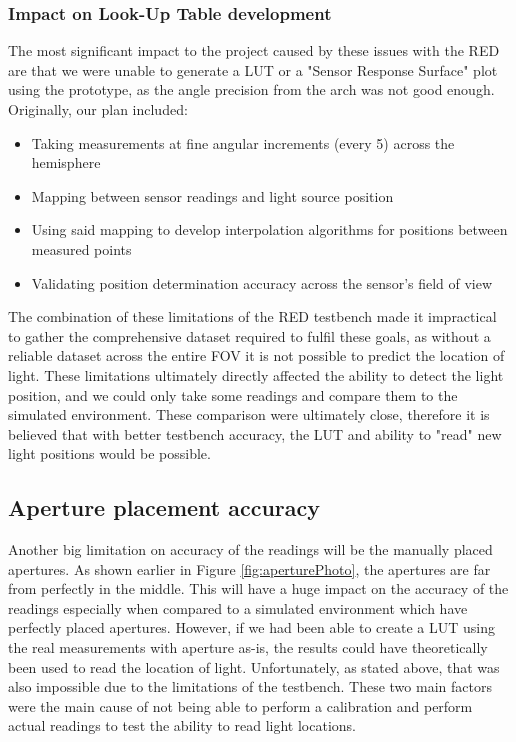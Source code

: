 \subsubsection{Impact on Look-Up Table development}

The most significant impact to the project caused by these issues with the \ac{RED} are that we were unable to generate a \ac{LUT} or a "Sensor Response Surface" plot using the prototype, as the angle precision from the arch was not good enough. Originally, our plan included:

\begin{itemize}
    \item Taking measurements at fine angular increments (every 5\textdegree{}) across the hemisphere
    \item Mapping between sensor readings and light source position
    \item Using said mapping to develop interpolation algorithms for positions between measured points
    \item Validating position determination accuracy across the sensor's field of view
\end{itemize}

The combination of these limitations of the \ac{RED} testbench made it impractical to gather the comprehensive dataset required to fulfil these goals, as without a reliable dataset across the entire \ac{FOV} it is not possible to predict the location of light.
These limitations ultimately directly affected the ability to detect the light position, and we could only take some readings and compare them to the simulated environment. These comparison were ultimately close, therefore it is believed that with better testbench accuracy, the \ac{LUT} and ability to "read" new light positions would be possible.

\subsection{Aperture placement accuracy}

Another big limitation on accuracy of the readings will be the manually placed apertures. As shown earlier in Figure \ref{fig:aperturePhoto}, the apertures are far from perfectly in the middle. This will have a huge impact on the accuracy of the readings especially when compared to a simulated environment which have perfectly placed apertures. However, if we had been able to create a \ac{LUT} using the real measurements with aperture as-is, the results could have theoretically been used to read the location of light. Unfortunately, as stated above, that was also impossible due to the limitations of the testbench. These two main factors were the main cause of not being able to perform a calibration and perform actual readings to test the ability to read light locations. 

